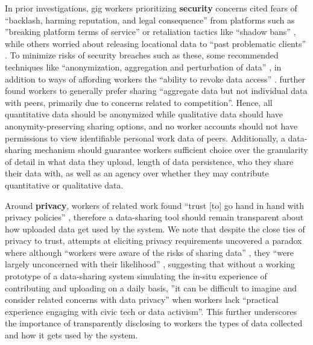 {In prior investigations, gig workers prioritizing \textbf{security} concerns cited fears of ``backlash, harming reputation, and legal consequence'' \cite{sousveillance} from platforms such as ''breaking platform terms of service'' or retaliation tactics like ``shadow bans'' \cite{uuapp}, while others worried about releasing locational data to ``past problematic clients'' \cite{supporting}. To minimize risks of security breaches such as these, some recommended techniques like ``anonymization, aggregation and perturbation of data'' \cite{uuapp}, in addition to ways of affording workers the ``ability to revoke data access'' \cite{supporting}. \citet{supporting} further found workers to generally prefer sharing ``aggregate data but not individual data with peers, primarily due to concerns related to competition''.
{Hence, all} quantitative data should be anonymized while qualitative data should have anonymity-preserving sharing options{, }and no worker accounts} should not have permissions to view identifiable personal work data of peers. {Additionally,} a data-sharing mechanism should guarantee workers sufficient choice over the granularity of detail in what data they upload, {length of data persistence,} who they share their data with, as well as an agency over whether they may contribute quantitative or qualitative data. 

{Around \textbf{privacy}, workers of related work found ``trust [to] go hand in hand with privacy policies'' \cite{supporting}, therefore a data-sharing tool} should remain transparent about how uploaded data get used by the system.
{We note that despite the close ties of privacy to trust, attempts at eliciting privacy requirements uncovered a paradox where although ``workers were aware of the risks of sharing data'' \cite{uuapp, privacy}, they ``were largely unconcerned with their likelihood'' \cite{supporting, uuapp}, suggesting that without a working prototype of a data-sharing system simulating the in-situ experience of contributing and uploading on a daily basis, ''it can be difficult to imagine and consider related concerns with data privacy'' when workers lack ``practical experience engaging with civic tech or data activism''. This further underscores the importance of transparently disclosing to workers the types of data collected and how it gets used by the system.}

